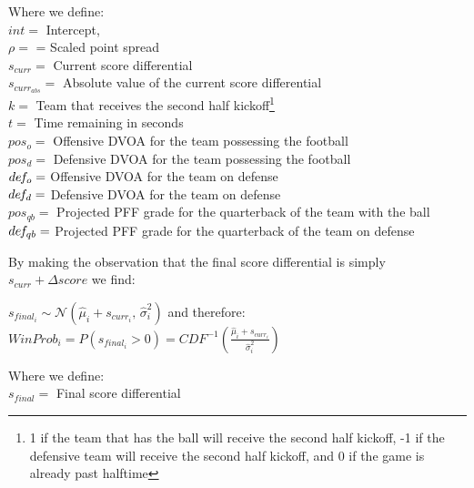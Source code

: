 \documentclass[12pt,twoside]{dukestatscithesis}
\begin{document}
Where we define:\\
\(int =\) Intercept,\\
\(\rho =\) = Scaled point spread\\
\(s_{curr} =\) Current score differential\\
\(s_{curr_{abs}} =\) Absolute value of the current score differential\\
\(k =\) Team that receives the second half kickoff\footnote{1 if the team that has the ball will receive the second half kickoff, -1 if the defensive team will receive the second half kickoff, and 0 if the game is already past halftime}\\
\(t =\) Time remaining in seconds\\
\(pos_o =\) Offensive DVOA for the team possessing the football\\
\(pos_d =\) Defensive DVOA for the team possessing the football\\
\(de\hspace{-0.1em}f_o =\) Offensive DVOA for the team on defense\\
\(de\hspace{-0.1em}f_d =\) Defensive DVOA for the team on defense\\
\(pos_{qb} =\) Projected PFF grade for the quarterback of the team with the ball\\
\(de\hspace{-0.1em}f_{qb} =\) Projected PFF grade for the quarterback of the team on defense

By making the observation that the final score differential is simply \(s_{curr} + \Delta score\) we find:

\(s_{final_i} \sim \mathcal{N}(\hat{\mu}_i + s_{curr_i},\,\hat{\sigma}_i^{2})\) and therefore:
\(WinProb_i = P(s_{final_i} > 0) = CDF^{-1}(\frac{\hat{\mu}_i + s_{curr_i}}{\hat{\sigma}^{2}_i})\)

Where we define:\\
\(s_{final} =\) Final score differential
\end{document}
